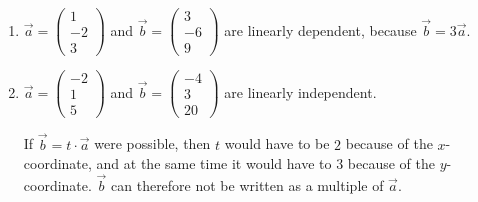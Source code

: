 \documentclass[12pt,eng]{skript_ogg}
\begin{document}
\begin{beispiel}
\begin{enumerate}
	\item $\vec{a}=\begin{pmatrix} 1\\-2\\3
\end{pmatrix}$ and $\vec{b}=\begin{pmatrix}
3\\-6\\9
\end{pmatrix}$ are linearly dependent, because $\vec{b}=3\vec{a}$.

\item $\vec{a}=\begin{pmatrix} -2\\1\\5
\end{pmatrix}$ and $\vec{b}=\begin{pmatrix}
-4\\3\\20
\end{pmatrix}$ are linearly independent.

If $\vec{b}=t\cdot\vec{a}$ were possible, then $t$ would have to be $2$ because of the $x$-coordinate, and at the same time it would have to $3$ because of the $y$-coordinate. $\vec{b}$ can therefore not be written as a multiple of  $\vec{a}$.
\end{enumerate}
\end{beispiel}

\vspace{-5mm}
\end{document}
